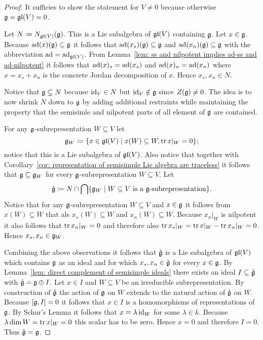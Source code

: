 \begin{proof}
 It sufficies to show the statement for $V \neq 0$ because otherwise $\mathfrak{g} = \mathfrak{gl}(V) = 0$.
 
 Let $N \coloneqq N_{\mathfrak{gl}(V)}(\mathfrak{g})$. This is a Lie subalgebra of $\mathfrak{gl}(V)$ containing $\mathfrak{g}$. Let $x \in \mathfrak{g}$. Because $\operatorname{ad}(x)(\mathfrak{g}) \subseteq \mathfrak{g}$ it follows that $\operatorname{ad}(x_s)(\mathfrak{g}) \subseteq \mathfrak{g}$ and $\operatorname{ad}(x_n)(\mathfrak{g}) \subseteq \mathfrak{g}$ with the abbreviation $\operatorname{ad} = \operatorname{ad}_{\mathfrak{gl}(V)}$. From Lemma~\ref{lem: ss and nilpotent implies ad-ss and ad-nilpotent} it follows that $\operatorname{ad}(x)_s = \operatorname{ad}(x_s)$ and $\operatorname{ad}(x)_n = \operatorname{ad}(x_n)$ where $x = x_s + x_n$ is the concrete Jordan decomposition of $x$. Hence $x_s, x_n \in N$.
 
 Notice that $\mathfrak{g} \subsetneq N$ because $\operatorname{id}_V \in N$ but $\operatorname{id}_V \notin \mathfrak{g}$ since $Z(\mathfrak{g}) \neq 0$. The idea is to now shrink $N$ down to $\mathfrak{g}$ by adding additional restraints while maintaining the property that the semisimle and nilpotent parts of all element of $\mathfrak{g}$ are contained.
 
 For any $\mathfrak{g}$-subrepresentation $W \subseteq V$ let
 \[
  \mathfrak{g}_W \coloneqq \{x \in \mathfrak{gl}(V) \mid x(W) \subseteq W, \operatorname{tr} x|_W = 0\};
 \]
 notice that this is a Lie subalgebra of $\mathfrak{gl}(V)$. Also notice that together with Corollary~\ref{cor: representation of semisimple Lie algebra are traceless} it follows that $\mathfrak{g} \subseteq \mathfrak{g}_W$ for every $\mathfrak{g}$-subrepresentation $W \subseteq V$. Let
 \[
  \hat{\mathfrak{g}} \coloneqq N \cap \bigcap \{\mathfrak{g}_W \mid \text{$W \subseteq V$ is a $\mathfrak{g}$-subrepresentation}\}.
 \]
 Notice that for any $\mathfrak{g}$-subrepresentation $W \subseteq V$ and $x \in \mathfrak{g}$ it follows from $x(W) \subseteq W$ that als $x_s(W) \subseteq W$ and $x_n(W) \subseteq W$. Because $x_n|_W$ is nilpotent it also follows that $\operatorname{tr} x_n|_W = 0$ and therefore also $\operatorname{tr} x_s|_W = \operatorname{tr} x|_W - \operatorname{tr} x_n|_W = 0$. Hence $x_s, x_n \in \mathfrak{g}_W$.
 
 Combining the above observations it follows that $\hat{\mathfrak{g}}$ is a Lie subalgebra of $\mathfrak{gl}(V)$ which contains $\mathfrak{g}$ as an ideal and for which $x_s, x_n \in \hat{\mathfrak{g}}$ for every $x \in \mathfrak{g}$. By Lemma~\ref{lem: direct complement of semisimple ideals} there exists an ideal $I \subseteq \hat{\mathfrak{g}}$ with $\hat{\mathfrak{g}} = \mathfrak{g} \oplus I$. Let $x \in I$ and $W \subseteq V$ be an irreducible subrepresentation. By construction of $\hat{\mathfrak{g}}$ the action of $\mathfrak{g}$ on $W$ extends to the natural action of $\hat{\mathfrak{g}}$ on $W$. Because $[\mathfrak{g},I] = 0$ it follows that $x \in I$ is a homomorphisms of representations of $\mathfrak{g}$. By Schur’s Lemma it follows that $x = \lambda \operatorname{id}_W$ for some $\lambda \in k$. Because $\lambda \dim W = \operatorname{tr} x|_W = 0$ this scalar has to be zero. Hence $x = 0$ and therefore $I = 0$. Thus $\hat{\mathfrak{g}} = \mathfrak{g}$.
\end{proof}



